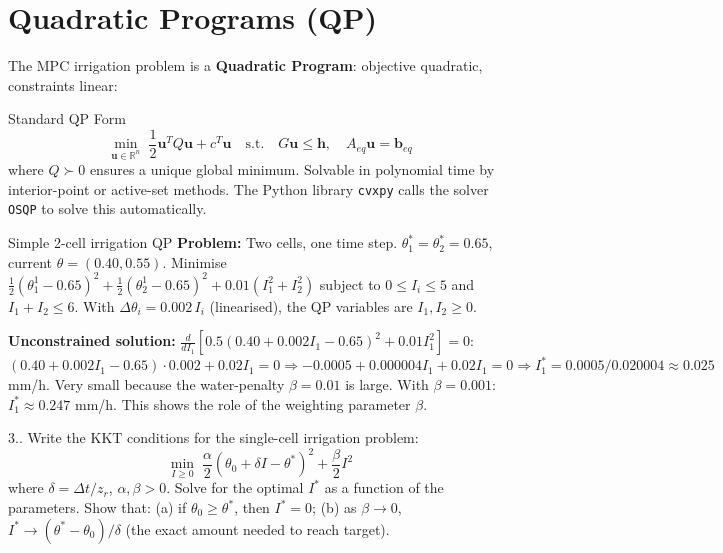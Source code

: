 \documentclass[12pt,a4paper,openany]{book}
\newcounter{exoctr}[chapter]
\renewcommand{\theexoctr}{\thechapter.\arabic{exoctr}}
\newcommand{\R}{\mathbb{R}}
\newcommand{\bu}{\bm{u}}
\begin{document}
\section{Quadratic Programs (QP)}

The MPC irrigation problem is a \textbf{Quadratic Program}: objective quadratic, constraints linear:

\begin{thmbox}{Standard QP Form}
\begin{equation}
\min_{\bu\in\R^n}\;\frac{1}{2}\bu^T Q\bu + c^T\bu\quad
\text{s.t.}\quad G\bu\leq\bm{h},\quad A_{eq}\bu=\bm{b}_{eq}
\label{eq:QP}
\end{equation}
where $Q\succ0$ ensures a unique global minimum. Solvable in polynomial time by interior-point or active-set methods. The Python library \texttt{cvxpy} calls the solver \texttt{OSQP} to solve this automatically.
\end{thmbox}

\begin{exbox}{Simple 2-cell irrigation QP}
\textbf{Problem:} Two cells, one time step. $\theta_1^*=\theta_2^*=0.65$, current $\theta=(0.40,0.55)$. Minimise $\frac{1}{2}(\theta_1^1-0.65)^2+\frac{1}{2}(\theta_2^1-0.65)^2+0.01(I_1^2+I_2^2)$ subject to $0\leq I_i\leq 5$ and $I_1+I_2\leq 6$. With $\Delta\theta_i = 0.002\,I_i$ (linearised), the QP variables are $I_1,I_2\geq0$.

\textbf{Unconstrained solution:} $\frac{d}{dI_1}[0.5(0.40+0.002I_1-0.65)^2+0.01I_1^2]=0$:
$(0.40+0.002I_1-0.65)\cdot0.002+0.02I_1=0\Rightarrow -0.0005+0.000004I_1+0.02I_1=0\Rightarrow I_1^*=0.0005/0.020004\approx 0.025$ mm/h. Very small because the water-penalty $\beta=0.01$ is large. With $\beta=0.001$: $I_1^*\approx 0.247$ mm/h. This shows the role of the weighting parameter $\beta$.
\end{exbox}

\begin{exobox}{3.\theexoctr}
Write the KKT conditions for the single-cell irrigation problem:
\[\min_{I\geq0}\;\frac{\alpha}{2}(\theta_0+\delta I - \theta^*)^2 + \frac{\beta}{2}I^2\]
where $\delta=\Delta t/z_r$, $\alpha,\beta>0$. Solve for the optimal $I^*$ as a function of the parameters. Show that: (a) if $\theta_0\geq\theta^*$, then $I^*=0$; (b) as $\beta\to0$, $I^*\to(\theta^*-\theta_0)/\delta$ (the exact amount needed to reach target).
\end{exobox}
\end{document}
